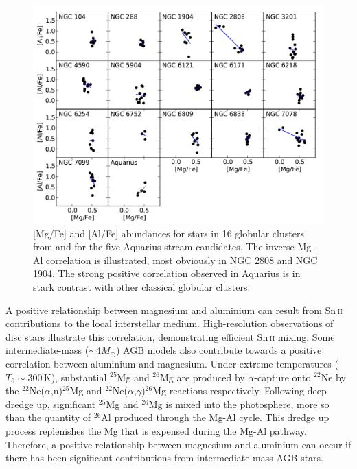 \documentclass{emulateapj}
\begin{document}
\begin{figure}[t!]
	\includegraphics[width=\textwidth]{./figures/aquarius-mg-al-cluster.pdf}
	\caption{[Mg/Fe] and [Al/Fe] abundances for stars in 16 globular clusters from \citet{carretta;et-al_2009a} and for the five Aquarius stream candidates. The inverse {Mg-Al} correlation is illustrated, most obviously in {NGC 2808} and {NGC 1904}. The strong positive correlation observed in Aquarius is in stark contrast with other classical globular clusters.}
	\label{fig:mg-al}
\end{figure}

A positive relationship between magnesium and aluminium can result from {Sn\,\textsc{ii}} contributions to the local interstellar medium. High-resolution observations of disc stars illustrate this correlation, demonstrating efficient {Sn\,\textsc{ii}} mixing. Some intermediate-mass ($\sim$4$M_\odot$) AGB models also contribute towards a positive correlation between aluminium and magnesium. Under extreme temperatures ($T_6 \sim 300$\,K), substantial $^{25}$Mg and $^{26}$Mg are produced by $\alpha$-capture onto $^{22}$Ne by the $^{22}$Ne($\alpha$,n)$^{25}$Mg and $^{22}$Ne($\alpha$,$\gamma$)$^{26}$Mg reactions respectively. Following deep dredge up, significant $^{25}$Mg and $^{26}$Mg is mixed into the photosphere, more so than the quantity of $^{26}$Al produced through the {Mg-Al} cycle. This dredge up process replenishes the Mg that is expensed during the {Mg-Al} pathway. Therefore, a positive relationship between magnesium and aluminium can occur if there has been significant contributions from intermediate mass AGB stars.
\end{document}
